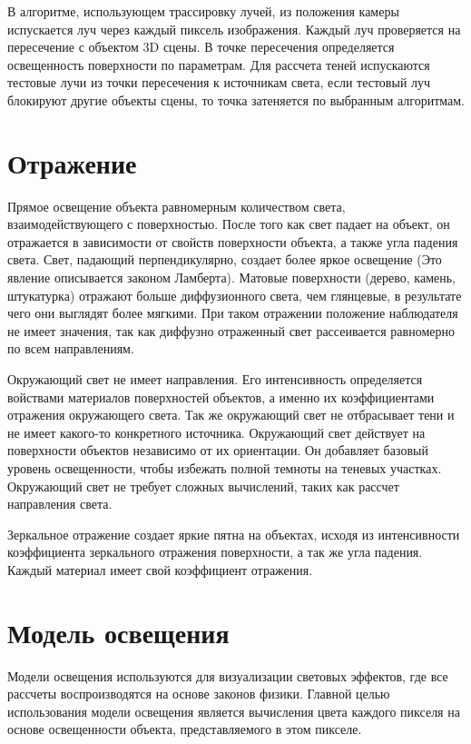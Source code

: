 В алгоритме, использующем трассировку лучей, из положения камеры испускается луч через каждый пиксель изображения. Каждый луч проверяется на пересечение с объектом 3D сцены. В точке пересечения определяется освещенность поверхности по параметрам. Для рассчета теней испускаются тестовые лучи из точки пересечения к источникам света, если тестовый луч блокируют другие объекты сцены, то точка затеняется по выбранным алгоритмам. 


\section{Отражение}
Прямое освещение объекта равномерным количеством света, взаимодействующего с поверхностью. После того как свет падает на объект, он отражается в зависимости от свойств поверхности объекта, а также угла падения света. Свет, падающий перпендикулярно, создает более яркое освещение (Это явление описывается законом Ламберта). Матовые поверхности (дерево, камень, штукатурка) отражают больше диффузионного света, чем глянцевые, в результате чего они выглядят более мягкими.
При таком отражении положение наблюдателя не имеет значения, так как диффузно отраженный свет рассеивается равномерно по всем направлениям.

Окружающий свет не имеет направления. Его интенсивность определяется войствами материалов поверхностей объектов, а именно их коэффициентами отражения окружающего света.
Так же окружающий свет не отбрасывает тени и не имеет какого-то конкретного источника.
Окружающий свет действует на поверхности объектов независимо от их ориентации. Он добавляет базовый уровень освещенности, чтобы избежать полной темноты на теневых участках. Окружающий свет не требует сложных вычислений, таких как рассчет направления света.
 
Зеркальное отражение создает яркие пятна на объектах, исходя из интенсивности коэффициента зеркального отражения поверхности, а так же угла падения.
Каждый материал имеет свой коэффициент отражения.

\section{Модель освещения}
Модели освещения используются для визуализации световых эффектов, где все рассчеты воспроизводятся на основе законов физики. Главной целью использования модели освещения является вычисления цвета каждого пикселя на основе освещенности объекта, представляемого в этом пикселе.

